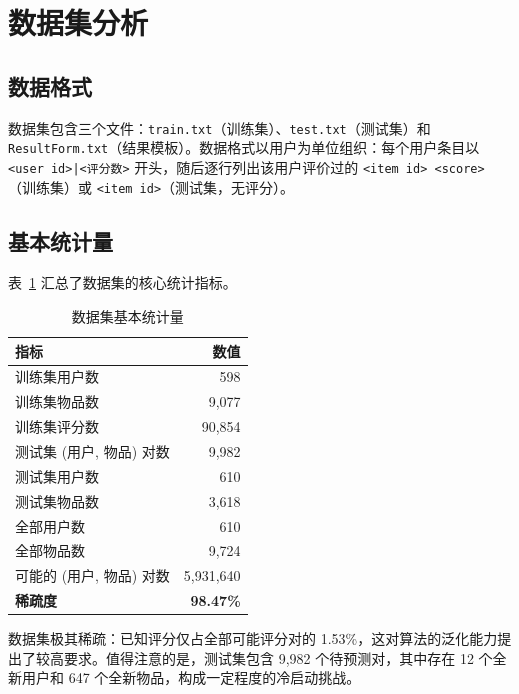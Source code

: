 \documentclass[UTF8,a4paper,10pt]{ctexart}
\begin{document}
\section{数据集分析}

\subsection{数据格式}

数据集包含三个文件：\texttt{train.txt}（训练集）、\texttt{test.txt}（测试集）和 \texttt{ResultForm.txt}（结果模板）。数据格式以用户为单位组织：每个用户条目以 \texttt{<user id>|<评分数>} 开头，随后逐行列出该用户评价过的 \texttt{<item id> <score>}（训练集）或 \texttt{<item id>}（测试集，无评分）。

\subsection{基本统计量}

表~\ref{tab:stats} 汇总了数据集的核心统计指标。

\begin{table}[htbp]
    \centering
    \setlength{\tabcolsep}{36pt}
    \caption{数据集基本统计量}
    \label{tab:stats}
    \begin{tabular}{@{}lr@{}}
        \toprule
        \textbf{指标} & \textbf{数值} \\
        \midrule
        训练集用户数     & 598 \\
        训练集物品数     & 9,077 \\
        训练集评分数     & 90,854 \\
        测试集 (用户, 物品) 对数 & 9,982 \\
        测试集用户数     & 610 \\
        测试集物品数     & 3,618 \\
        全部用户数       & 610 \\
        全部物品数       & 9,724 \\
        可能的 (用户, 物品) 对数 & 5,931,640 \\
        \textbf{稀疏度}  & \textbf{98.47\%} \\
        \bottomrule
    \end{tabular}
\end{table}

数据集极其稀疏：已知评分仅占全部可能评分对的 1.53\%，这对算法的泛化能力提出了较高要求。值得注意的是，测试集包含 9,982 个待预测对，其中存在 12 个全新用户和 647 个全新物品，构成一定程度的冷启动挑战。
\end{document}

